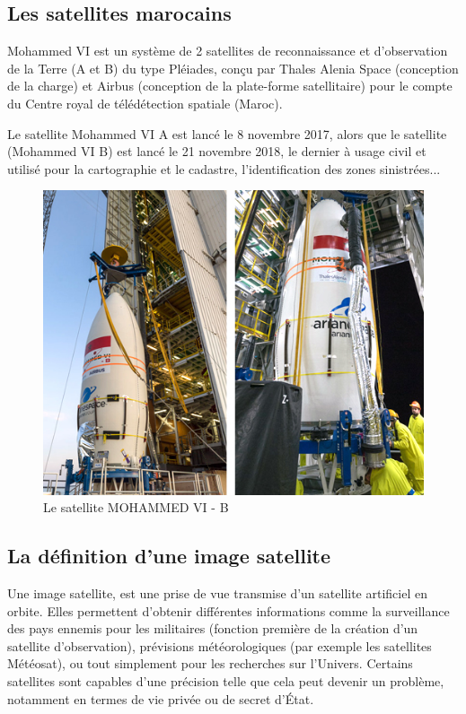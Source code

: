 \documentclass[12pt, openany]{report}
\begin{document}
\subsection{Les satellites marocains}
Mohammed VI est un système de 2 satellites de reconnaissance et d'observation de la Terre (A et B) du type Pléiades, conçu par Thales Alenia Space (conception de la charge) et Airbus (conception de la plate-forme satellitaire) pour le compte du Centre royal de télédétection spatiale (Maroc).
\par
Le satellite Mohammed VI A est lancé le 8 novembre 2017, alors que le satellite (Mohammed VI B) est lancé le 21 novembre 2018, le dernier à usage civil et utilisé pour la cartographie et le cadastre, l’identification des zones sinistrées...
\begin{figure}[H]
\centering
\includegraphics[scale=0.5]{satm6.jpg}
\caption{Le satellite MOHAMMED VI - B}
\end{figure}


\subsection{La définition d'une image satellite}
Une image satellite, est une prise de vue transmise d'un satellite artificiel en orbite. Elles permettent d'obtenir différentes informations comme la surveillance des pays ennemis pour les militaires (fonction première de la création d'un satellite d'observation), prévisions météorologiques (par exemple les satellites Météosat), ou tout simplement pour les recherches sur l'Univers. Certains satellites sont capables d'une précision telle que cela peut devenir un problème, notamment en termes de vie privée ou de secret d'État. 
\end{document}
